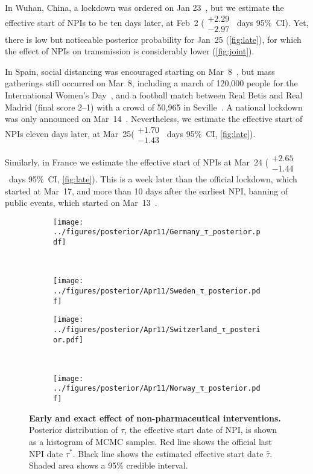 \documentclass[12pt]{extarticle}
\begin{document}
In Wuhan, China, a lockdown was ordered on Jan 23~\citep{Li2020}, but we estimate the effective start of NPIs to be ten days later, at Feb~2 ($\substack{+2.29 \\ -2.97}$~days 95\%~CI). Yet, there is low but noticeable posterior probability for Jan~25 (\autoref{fig:late}), for which the effect of NPIs on transmission is considerably lower (\autoref{fig:joint}).

In Spain, social distancing was encouraged starting on Mar~8~\citep{Flaxman2020}, but mass gatherings still occurred on Mar~8, including a march of 120,000 people for the International Women's Day~\citep{RaphaelMinder}, and a football match between Real Betis and Real Madrid (final score 2--1) with a crowd of 50,965 in Seville~\citep{ESPNRealBetis}.
A national lockdown was only announced on Mar~14~\citep{Flaxman2020}.
Nevertheless, we estimate the effective start of NPIs eleven days later, at Mar~25($\substack{+1.70 \\ -1.43}$~days 95\%~CI, \autoref{fig:late}).

Similarly, in France we estimate the effective start of NPIs at Mar~24 ($\substack{+2.65 \\ -1.44}$~days 95\%~CI, \autoref{fig:late}).
This is a week later than the official lockdown, which started at Mar~17, and more than 10 days after the earliest NPI, banning of public events, which started on Mar~13~\citep{Flaxman2020}.



\begin{figure}[h]
    \centering
    \begin{subfigure}{0.45\textwidth}
        \texttt{[image: ../figures/posterior/Apr11/Germany\_τ\_posterior.pdf]}
    \end{subfigure}
    ~
    \begin{subfigure}{0.45\textwidth}
		\texttt{[image: ../figures/posterior/Apr11/Sweden\_τ\_posterior.pdf]}
    \end{subfigure}
    
	\begin{subfigure}{0.45\textwidth}
        \texttt{[image: ../figures/posterior/Apr11/Switzerland\_τ\_posterior.pdf]}
    \end{subfigure}
    ~
    \begin{subfigure}{0.45\textwidth}
		\texttt{[image: ../figures/posterior/Apr11/Norway\_τ\_posterior.pdf]}
    \end{subfigure}
    \caption{
    \textbf{Early and exact effect of non-pharmaceutical interventions.}
    Posterior distribution of $\tau$, the effective start date of NPI, is shown as a histogram of MCMC samples. Red line shows the official last NPI date $\tau^*$. Black line shows the estimated effective start date $\hat{\tau}$. Shaded area shows a 95\% credible interval. 
	}
	\label{fig:early}
\end{figure}
\end{document}
